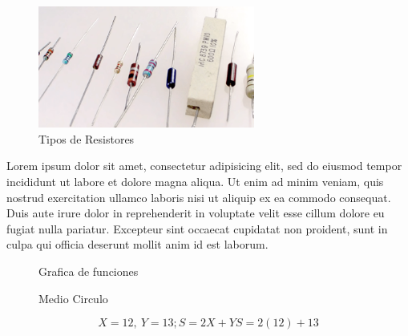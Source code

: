 \documentclass[12pt]{article}
\begin{document}
\begin{multicols}{2}
		\begin{figure}[H]
			\centering
			\includegraphics[height=4cm]{imagenes/resistencias.png}
			\caption{Tipos de Resistores}
			\label{FIG:Resistores}
		\end{figure}
		Lorem ipsum dolor sit amet, consectetur adipisicing elit, sed 
		do eiusmod tempor incididunt ut labore et dolore magna aliqua. 
		Ut enim ad minim veniam, quis nostrud exercitation ullamco 
		laboris nisi ut aliquip ex ea commodo consequat. Duis aute irure 
		dolor in reprehenderit in voluptate velit esse cillum dolore eu 
		fugiat nulla pariatur. Excepteur sint occaecat cupidatat non 
		proident, sunt in culpa qui officia deserunt mollit anim id 
		est laborum.
		
	\end{multicols}

	
	\begin{figure}[b!]
		\centering
		\caption{Grafica de funciones}
		\label{FIG:Grafica-de-Senos}
	\end{figure}

	
	
	\begin{figure}
		\centering

		\caption{Medio Circulo}
		\label{FIG:Medio-circulo}

	\end{figure}
	$$
	X=12,\ Y=13;
	S=2X+Y
	S=2(12)+13
	$$
\end{document}
